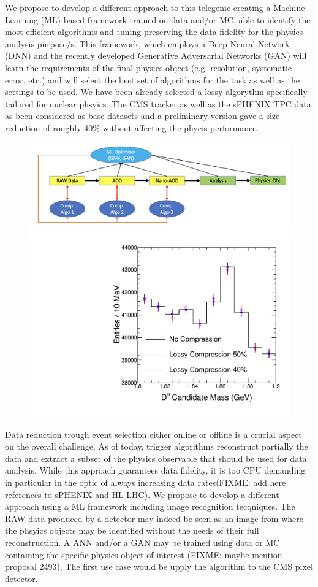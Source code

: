 We propose to develop a different approach to this telegenic creating a Machine Learning (ML) based framework trained on data and/or MC, able to identify the most efficient algorithms and tuning preserving the data fidelity for the physics analysis purpose/s. This framework, which employs a Deep Neural Network (DNN) and the recently developed Generative Adversarial Networks (GAN) will learn the requirements of the final physics object (e.g. resolution, systematic error, etc.) and will select the best set of algorithms for the task as well as the settings to be used. We have been already selected a lossy algorythm specifically tailored for nuclear phsyics. The CMS tracker as well as the sPHENIX TPC data as been considered as base datasets and a preliminary version gave a size reduction of roughly 40\% without affecting the phycis performance. 

\begin{figure}[!ht]
    \vspace{-0.4cm}
    \begin{center}
    \includegraphics[width=.71\textwidth]{CompSchema.png}
    \hspace{0.0\textwidth}
    \includegraphics[width=.27\textwidth]{HI_Compress/figure/aleph/Performance.pdf}
    \vspace{-0.5cm}
    \caption{}
    \label{fig:concept}
    \end{center}
\end{figure}

Data reduction trough event selection either online or offline is a crucial aspect on the overall challenge. As of today, trigger algorithms reconstruct partially the data and extract a subset of the physics observable that should be used for data analysis. While this approach guarantees data fidelity, it is too CPU demanding in particular in the optic of always increasing data rates(FIXME: add here references to sPHENIX and HL-LHC). We propose to develop a different approach using a ML framework including image recognition tecqniques. The RAW data produced by a detector may indeed be seen as an image from where the phsyics objects may be identified without the needs of their full reconstruction. A ANN and/or a GAN may be trained using data or MC containing the specific physics object of interest (FIXME: maybe mention proposal 2493). The first use case would be upply the algorithm to the CMS pixel detector.
 


